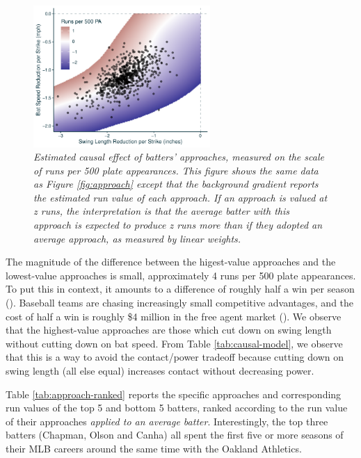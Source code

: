 \documentclass{article}
\begin{document}
      \begin{figure}[H]
        \centering
        \includegraphics[width = 0.6\textwidth]{figures/approach_run_value.pdf}
        \caption{\it Estimated causal effect of batters' approaches, measured on the scale of runs per 500 plate appearances. This figure shows the same data as Figure \ref{fig:approach} except that the background gradient reports the estimated run value of each approach. If an approach is valued at z runs, the interpretation is that the average batter with this approach is expected to produce z runs more than if they adopted an average approach, as measured by linear weights.}
        \label{fig:approach-run-value}
      \end{figure}

      The magnitude of the difference between the higest-value approaches and the lowest-value approaches is small, approximately 4 runs per 500 plate appearances. To put this in context, it amounts to a difference of roughly half a win per season (\cite{slowinski_converting_2010}). Baseball teams are chasing increasingly small competitive advantages, and the cost of half a win is roughly \$4 million in the free agent market (\cite{clemens_what_2021}). We observe that the highest-value approaches are those which cut down on swing length without cutting down on bat speed. From Table \ref{tab:causal-model}, we observe that this is a way to avoid the contact/power tradeoff because cutting down on swing length (all else equal) increases contact without decreasing power.

      Table \ref{tab:approach-ranked} reports the specific approaches and corresponding run values of the top 5 and bottom 5 batters, ranked according to the run value of their approaches {\it applied to an average batter}. Interestingly, the top three batters (Chapman, Olson and Canha) all spent the first five or more seasons of their MLB careers around the same time with the Oakland Athletics.
\end{document}
